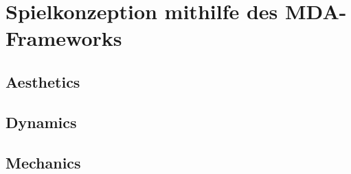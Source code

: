 \section{Spielkonzeption mithilfe des MDA-Frameworks}






\subsection{Aesthetics}
\subsection{Dynamics}
\subsection{Mechanics}







